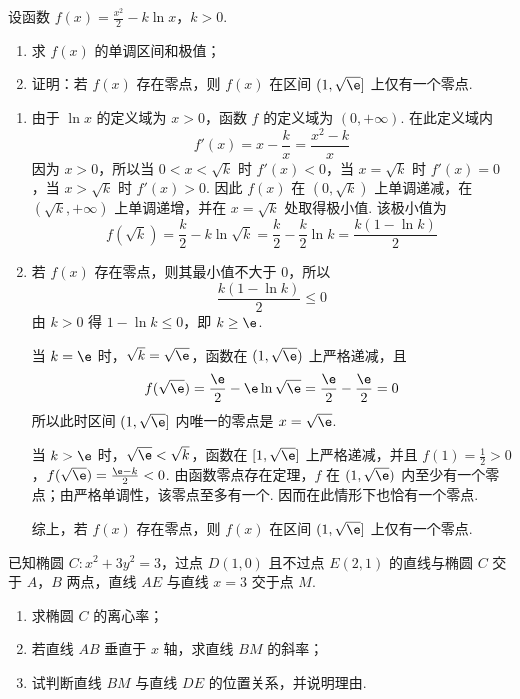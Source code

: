 \begin{problem}
设函数 \(f(x) = \frac{x^2}{2} - k\ln x\)，\(k > 0\).

\begin{enumerate}
\item 求 \( f(x) \) 的单调区间和极值；
\item 证明：若 \( f(x) \) 存在零点，则 \( f(x) \) 在区间 \( (1, \sqrt{\e}] \) 上仅有一个零点.
\end{enumerate}
\end{problem}

\begin{solution}
\begin{enumerate}
\item 由于 \(\ln x\) 的定义域为 \(x>0\)，函数 \(f\) 的定义域为 \((0,+\infty)\). 在此定义域内
\[
f'(x)=x-\frac{k}{x}=\frac{x^2-k}{x}
\]
因为 \(x>0\)，所以当 \(0<x<\sqrt{k}\) 时 \(f'(x)<0\)，当 \(x=\sqrt{k}\) 时 \(f'(x)=0\)，当 \(x>\sqrt{k}\) 时 \(f'(x)>0\). 因此 \(f(x)\) 在 \((0,\sqrt{k})\) 上单调递减，在 \((\sqrt{k},+\infty)\) 上单调递增，并在 \(x=\sqrt{k}\) 处取得极小值. 该极小值为
\[
f(\sqrt{k})=\frac{k}{2}-k\ln\sqrt{k}=\frac{k}{2}-\frac{k}{2}\ln k=\frac{k(1-\ln k)}{2}
\]
\item 若 \(f(x)\) 存在零点，则其最小值不大于 \(0\)，所以
\[
\frac{k(1-\ln k)}{2}\leq0
\]
由 \(k>0\) 得 \(1-\ln k\leq0\)，即 \(k\geq\e\).

当 \(k=\e\) 时，\(\sqrt{k}=\sqrt{\e}\)，函数在 \((1,\sqrt{\e})\) 上严格递减，且
\[
f(\sqrt{\e})=\frac{\e}{2}-\e\ln\sqrt{\e}=\frac{\e}{2}-\frac{\e}{2}=0
\]
所以此时区间 \((1,\sqrt{\e}]\) 内唯一的零点是 \(x=\sqrt{\e}\).

当 \(k>\e\) 时，\(\sqrt{\e}<\sqrt{k}\)，函数在 \([1,\sqrt{\e}]\) 上严格递减，并且
\(f(1)=\frac12>0\)，\(f(\sqrt{\e})=\frac{\e-k}{2}<0\).
由函数零点存在定理，\(f\) 在 \((1,\sqrt{\e})\) 内至少有一个零点；由严格单调性，该零点至多有一个. 因而在此情形下也恰有一个零点.

综上，若 \(f(x)\) 存在零点，则 \(f(x)\) 在区间 \((1,\sqrt{\e}]\) 上仅有一个零点.
\end{enumerate}
\end{solution}

\begin{problem}
已知椭圆 \(C: x^{2} + 3y^{2} = 3\)，过点 \(D(1,0)\) 且不过点 \(E(2,1)\) 的直线与椭圆 \(C\) 交于 \(A\)，\(B\) 两点，直线 \(AE\) 与直线 \(x = 3\) 交于点 \(M\).

\begin{enumerate}
\item 求椭圆 \(C\) 的离心率；
\item 若直线 \(AB\) 垂直于 \(x\) 轴，求直线 \(BM\) 的斜率；
\item 试判断直线 \(BM\) 与直线 \(DE\) 的位置关系，并说明理由.
\end{enumerate}
\end{problem}


